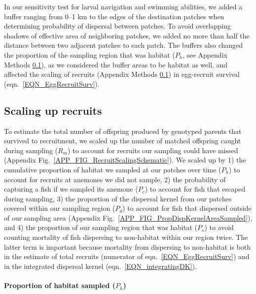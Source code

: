 \documentclass[12pt, oneside]{article}   	%
\begin{document}
In our sensitivity test for larval navigation and swimming abilities, we added a buffer ranging from 0--1 km to the edges of the destination patches when determining probability of dispersal between patches. To avoid overlapping shadows of effective area of neighboring patches, we added no more than half the distance between two adjacent patches to each patch. The buffers also changed the proportion of the sampling region that was habitat ($P_h$, see Appendix Methods \ref{APP_SEC_METHODS_ScalingUpRecruits}), as we considered the buffer areas to be habitat as well, and affected the scaling of recruits (Appendix Methods \ref{APP_SEC_METHODS_ScalingUpRecruits}) in egg-recruit survival (eqn.\ \ref{EQN_EggRecruitSurv}).

\subsection{Scaling up recruits} \label{APP_SEC_METHODS_ScalingUpRecruits}

To estimate the total number of offspring produced by genotyped parents that survived to recruitment, we scaled up the number of matched offspring caught during sampling ($R_m$) to account for recruits our sampling could have missed (Appendix Fig.\ \ref{APP_FIG_RecruitScalingSchematic}). We scaled up by 1) the cumulative proportion of habitat we sampled at our patches over time ($P_h$) to account for recruits at anemones we did not sample, 2) the probability of capturing a fish if we sampled its anemone ($P_c$) to account for fish that escaped during sampling, 3) the proportion of the dispersal kernel from our patches covered within our sampling region ($P_d$) to account for fish that dispersed outside of our sampling area (Appendix Fig.\ \ref{APP_FIG_PropDispKernelAreaSampled}), and 4) the proportion of our sampling region that was habitat ($P_s$) to avoid counting mortality of fish dispersing to non-habitat within our region twice. The latter term is important because mortality from dispersing to non-habitat is both in the estimate of total recruits (numerator of eqn.\ \ref{EQN_EggRecruitSurv}) and in the integrated dispersal kernel (eqn.\ \ref{EQN_integratingDK}). %

\paragraph*{Proportion of habitat sampled ($P_h$)} %
\end{document}
